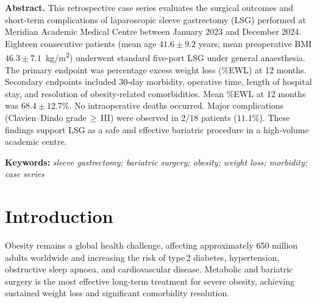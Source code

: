 \documentclass[11pt,a4paper]{article}
\begin{document}
\vspace{10pt}

\begin{tcolorbox}[
  enhanced,
  colback=SurgBlue!4,
  colframe=SurgBlue,
  arc=3pt, boxrule=0.5pt,
  left=12pt, right=12pt, top=8pt, bottom=8pt,
]
\textbf{\color{SurgBlue}Abstract.}\enspace
This retrospective case series evaluates the surgical outcomes and short-term complications
of laparoscopic sleeve gastrectomy (LSG) performed at Meridian Academic Medical Centre
between January 2023 and December 2024. Eighteen consecutive patients (mean age
$41.6 \pm 9.2$ years; mean preoperative BMI $46.3 \pm 7.1$~kg/m\textsuperscript{2})
underwent standard five-port LSG under general anaesthesia. The primary endpoint was
percentage excess weight loss (\%EWL) at 12 months. Secondary endpoints included
30-day morbidity, operative time, length of hospital stay, and resolution of obesity-related
comorbidities. Mean \%EWL at 12 months was $68.4 \pm 12.7\%$. No intraoperative deaths
occurred. Major complications (Clavien--Dindo grade\,$\geq$\,III) were observed in
$2/18$ patients ($11.1\%$). These findings support LSG as a safe and effective bariatric
procedure in a high-volume academic centre.

\smallskip
\textbf{\color{SurgTeal}Keywords:}
\textit{sleeve gastrectomy; bariatric surgery; obesity; weight loss; morbidity; case series}
\end{tcolorbox}

\vspace{6pt}

\section{Introduction}

Obesity remains a global health challenge, affecting approximately 650 million adults
worldwide and increasing the risk of type\,2 diabetes, hypertension, obstructive sleep
apnoea, and cardiovascular disease. Metabolic and bariatric surgery is the most effective
long-term treatment for severe obesity, achieving sustained weight loss and significant
comorbidity resolution.
\end{document}
